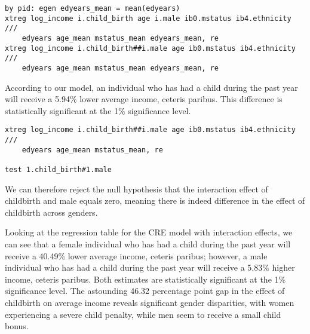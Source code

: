 \begin{verbatim}
by pid: egen edyears_mean = mean(edyears)
xtreg log_income i.child_birth age i.male ib0.mstatus ib4.ethnicity ///
    edyears age_mean mstatus_mean edyears_mean, re
xtreg log_income i.child_birth##i.male age ib0.mstatus ib4.ethnicity ///
    edyears age_mean mstatus_mean edyears_mean, re
\end{verbatim}

According to our model, an individual who has had a child during the past year will receive a 5.94\% lower average income, ceteris paribus. This difference is statistically significant at the 1\% significance level.


\begin{verbatim}
xtreg log_income i.child_birth##i.male age ib0.mstatus ib4.ethnicity ///
    edyears age_mean mstatus_mean, re

test 1.child_birth#1.male
\end{verbatim}


We can therefore reject the null hypothesis that the interaction effect of childbirth and male equals zero, meaning there is indeed difference in the effect of childbirth across genders.



Looking at the regression table for the CRE model with interaction effects, we can see that a female individual who has had a child during the past year will receive a 40.49\% lower average income, ceteris paribus; however, a male individual who has had a child during the past year will receive a 5.83\% higher income, ceteris paribus. Both estimates are statistically significant at the 1\% significance level. The astounding 46.32 percentage point gap in the effect of childbirth on average income reveals significant gender disparities, with women experiencing a severe child penalty, while men seem to receive a small child bonus.